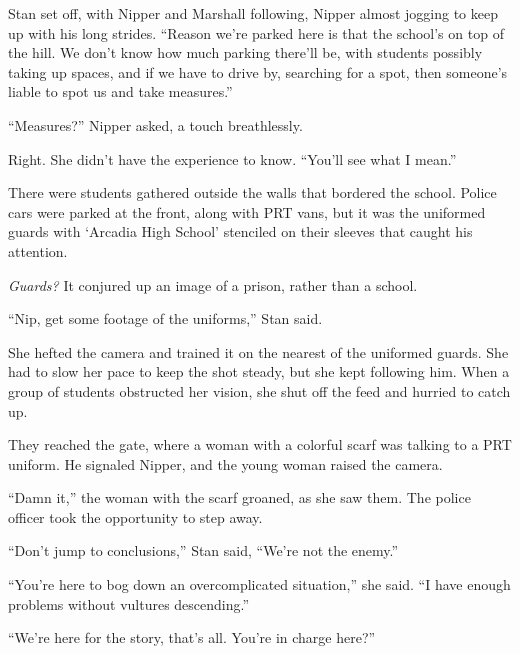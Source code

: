 Stan set off, with Nipper and Marshall following, Nipper almost jogging to keep up with his long strides.  ``Reason we're parked here is that the school's on top of the hill.  We don't know how much parking there'll be, with students possibly taking up spaces, and if we have to drive by, searching for a spot, then someone's liable to spot us and take measures.''



``Measures?'' Nipper asked, a touch breathlessly.



Right.  She didn't have the experience to know.  ``You'll see what I mean.''



There were students gathered outside the walls that bordered the school.  Police cars were parked at the front, along with PRT vans, but it was the uniformed guards with `Arcadia High School' stenciled on their sleeves that caught his attention.



\emph{Guards?  }It conjured up an image of a prison, rather than a school.



``Nip, get some footage of the uniforms,'' Stan said.



She hefted the camera and trained it on the nearest of the uniformed guards.  She had to slow her pace to keep the shot steady, but she kept following him.  When a group of students obstructed her vision, she shut off the feed and hurried to catch up.



They reached the gate, where a woman with a colorful scarf was talking to a PRT uniform.  He signaled Nipper, and the young woman raised the camera.



``Damn it,'' the woman with the scarf groaned, as she saw them.  The police officer took the opportunity to step away.



``Don't jump to conclusions,'' Stan said, ``We're not the enemy.''



``You're here to bog down an overcomplicated situation,'' she said.  ``I have enough problems without vultures descending.''



``We're here for the story, that's all.  You're in charge here?''



